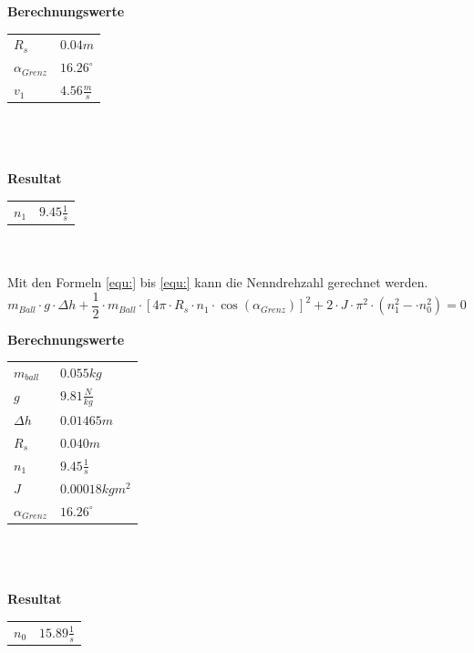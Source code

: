 \textbf{Berechnungswerte}\\
\begin{tabular}{ll}
	\rule{0pt}{11pt} $R_s$ & $0.04 m$ \\
	\rule{0pt}{11pt} $\alpha_{Grenz}$ & $16.26^\circ$ \\
	\rule{0pt}{11pt} $v_1$ & $4.56 \frac{m}{s}$ \\
\end{tabular}\\
\\
\\
\textbf{Resultat}\\
\begin{tabular}{ll}
	\rule{0pt}{11pt} $n_1$ & $9.45 \frac{1}{s}$ \\
\end{tabular}\\
\\
Mit den Formeln \ref{equ:} bis \ref{equ:} kann die Nenndrehzahl gerechnet werden.
\begin{equation}
	m_{Ball} \cdot g \cdot \Delta h + \frac{1}{2} \cdot m_{Ball} \cdot \left[4\pi 
	\cdot R_s \cdot n_1 \cdot \cos(\alpha_{Grenz})\right]^2 + 2 \cdot J \cdot \pi^2 
	\cdot \left(n_1^2-\cdot n_0^2\right) = 0
\end{equation}

\textbf{Berechnungswerte}\\
\begin{tabular}{ll}
	\rule{0pt}{11pt} $m_{ball}$ & $0.055 kg$ \\
	\rule{0pt}{11pt} $g$ & $9.81 \frac{N}{kg}$ \\
	\rule{0pt}{11pt} $\Delta h$ & $0.01465 m$ \\
	\rule{0pt}{11pt} $R_s$ & $0.040 m$ \\
	\rule{0pt}{11pt} $n_1$ & $9.45\frac{1}{s}$ \\
	\rule{0pt}{11pt} $J$ & $0.00018 kgm^2$ \\
	\rule{0pt}{11pt} $\alpha_{Grenz}$ & $16.26^\circ$ \\
\end{tabular}\\
\\
\\
\textbf{Resultat}\\
\begin{tabular}{ll}
	\rule{0pt}{11pt} $n_0$ & $15.89 \frac{1}{s}$ \\
\end{tabular}\\

